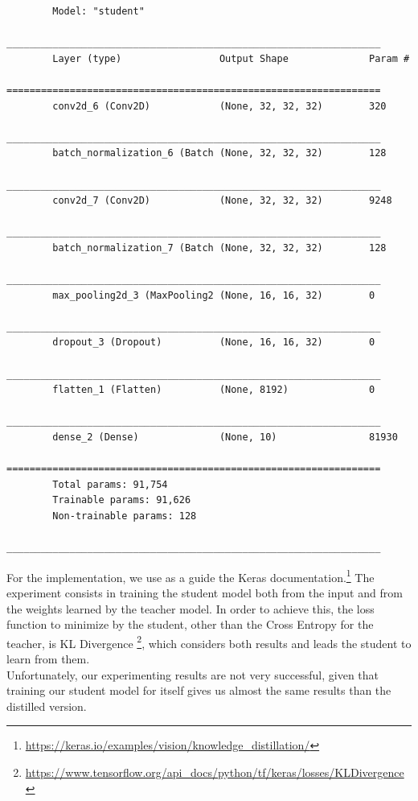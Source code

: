 \begin{center}
    \begin{verbatim}
        Model: "student"
        _________________________________________________________________
        Layer (type)                 Output Shape              Param #   
        =================================================================
        conv2d_6 (Conv2D)            (None, 32, 32, 32)        320       
        _________________________________________________________________
        batch_normalization_6 (Batch (None, 32, 32, 32)        128       
        _________________________________________________________________
        conv2d_7 (Conv2D)            (None, 32, 32, 32)        9248      
        _________________________________________________________________
        batch_normalization_7 (Batch (None, 32, 32, 32)        128       
        _________________________________________________________________
        max_pooling2d_3 (MaxPooling2 (None, 16, 16, 32)        0         
        _________________________________________________________________
        dropout_3 (Dropout)          (None, 16, 16, 32)        0         
        _________________________________________________________________
        flatten_1 (Flatten)          (None, 8192)              0         
        _________________________________________________________________
        dense_2 (Dense)              (None, 10)                81930     
        =================================================================
        Total params: 91,754
        Trainable params: 91,626
        Non-trainable params: 128
        _________________________________________________________________
    \end{verbatim}
\end{center}
For the implementation, we use as a guide the Keras documentation.\footnote{\href{https://keras.io/examples/vision/knowledge\_distillation/}{https://keras.io/examples/vision/knowledge\_distillation/}}
The experiment consists in training the student model both from the input and from the weights learned by the teacher model.
In order to achieve this, the loss function to minimize by the student, other than the Cross Entropy for the teacher, is KL Divergence
\footnote{\href{https://www.tensorflow.org/api\_docs/python/tf/keras/losses/KLDivergence}{https://www.tensorflow.org/api\_docs/python/tf/keras/losses/KLDivergence}},
which considers both results and leads the student to learn from them.\\
Unfortunately, our experimenting results are not very successful, given that training our student model for itself gives us almost the same results than the distilled version.
